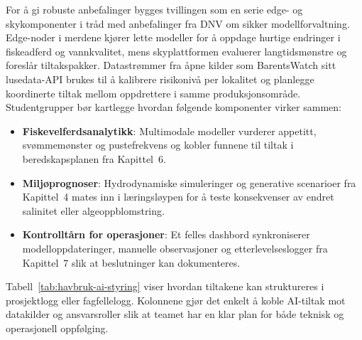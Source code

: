 For å gi robuste anbefalinger bygges tvillingen som en serie edge- og skykomponenter i tråd med anbefalinger fra DNV om sikker modellforvaltning.\citep{dnv2020rpa204} Edge-noder i merdene kjører lette modeller for å oppdage hurtige endringer i fiskeadferd og vannkvalitet, mens skyplattformen evaluerer langtidsmønstre og foreslår tiltakspakker. Datastrømmer fra åpne kilder som BarentsWatch sitt lusedata-API brukes til å kalibrere risikonivå per lokalitet og planlegge koordinerte tiltak mellom oppdrettere i samme produksjonsområde.\citep{barentswatch2023lusedata} Studentgrupper bør kartlegge hvordan følgende komponenter virker sammen:
\begin{itemize}
    \item \textbf{Fiskevelferdsanalytikk}: Multimodale modeller vurderer appetitt, svømmemønster og pustefrekvens og kobler funnene til tiltak i beredskapsplanen fra Kapittel~6.
    \item \textbf{Miljøprognoser}: Hydrodynamiske simuleringer og generative scenarioer fra Kapittel~4 mates inn i læringsløypen for å teste konsekvenser av endret salinitet eller algeoppblomstring.
    \item \textbf{Kontrolltårn for operasjoner}: Et felles dashbord synkroniserer modelloppdateringer, manuelle observasjoner og etterlevelseslogger fra Kapittel~7 slik at beslutninger kan dokumenteres.
\end{itemize}

Tabell~\ref{tab:havbruk-ai-styring} viser hvordan tiltakene kan struktureres i prosjektlogg eller fagfellelogg. Kolonnene gjør det enkelt å koble AI-tiltak mot datakilder og ansvarsroller slik at teamet har en klar plan for både teknisk og operasjonell oppfølging.

